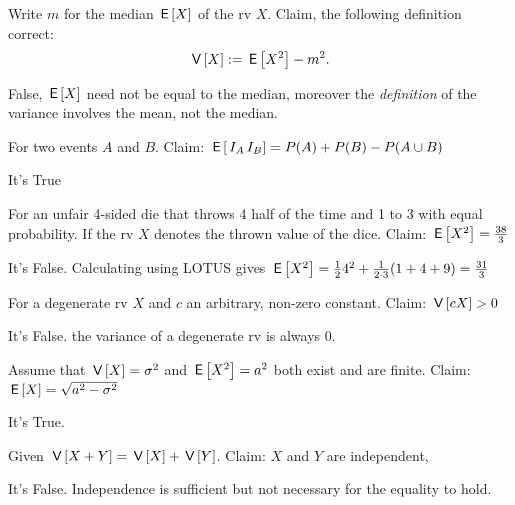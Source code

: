 \documentclass[tf-tutorial-all.tex]{subfiles}
\begin{document}
\begin{truefalse}
Write $m$ for the median $\,\mathsf{E}\left[X\right]$ of the rv $X$. Claim, the following definition correct:
\begin{equation*}
\,\mathsf{V}\left[X\right] := \,\mathsf{E}\left[X^2\right] - m^{2}.
\end{equation*}
\begin{solution}
False, $\,\mathsf{E}\left[X\right]$ need not be equal to the median, moreover the \emph{definition} of the variance involves the mean, not the median.
\end{solution}
\end{truefalse}


\begin{truefalse}
    For two events $A$ and $B$. Claim: $\,\mathsf{E}\left[\,I_{A}\,I_{B}\right] = P(A) + P(B) - P(A \cup B)$
\begin{solution}
It's True
\end{solution}
\end{truefalse}

\begin{truefalse}
For an unfair 4-sided die that throws 4 half of the time and 1 to 3 with equal probability.
If the rv
$X$ denotes the thrown value of the dice.
Claim: $\,\mathsf{E}\left[X^2\right] = \frac{38}{3}$
\begin{solution}
It's False. Calculating using LOTUS gives $\,\mathsf{E}\left[X^2\right] = \frac{1}{2} 4^{2} + \frac{1}{2\cdot3}(1 + 4 + 9) = \frac{31}{3}$
\end{solution}
\end{truefalse}

\begin{truefalse}
For a degenerate rv $X$ and $c$ an arbitrary, non-zero constant. Claim: $\,\mathsf{V}\left[cX\right] > 0$
\begin{solution}
It's False. the variance of a degenerate rv is always 0.
\end{solution}
\end{truefalse}

\begin{truefalse}
Assume that $\,\mathsf{V}\left[X\right] = \sigma^2$ and $\,\mathsf{E}\left[X^2\right] = a^2$ both exist and are finite. Claim:$ \,\mathsf{E}\left[X\right] = \sqrt{a^2-\sigma^2}$
\begin{solution}
It's True.
\end{solution}
\end{truefalse}

\begin{truefalse}
Given $\,\mathsf{V}\left[X+Y\right] = \,\mathsf{V}\left[X\right] + \,\mathsf{V}\left[Y\right]$. Claim: $X$ and $Y$ are independent,
\begin{solution}
It's False. Independence is sufficient but not necessary for the equality to hold.
\end{solution}
\end{truefalse}
\end{document}
